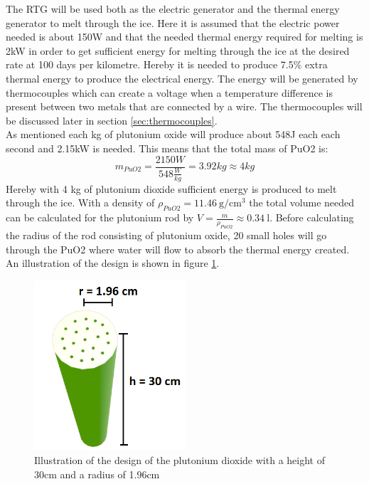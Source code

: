 \label{sec:ThermalDesign}
The RTG will be used both as the electric generator and the thermal energy generator to melt through the ice. Here it is assumed that the electric power needed is about 150W and that the needed thermal energy required for melting is 2kW in order to get sufficient energy for melting through the ice at the desired rate at 100 days per kilometre. Hereby it is needed to produce 7.5\% extra thermal energy to produce the electrical energy. The energy will be generated by thermocouples which can create a voltage when a temperature difference is present between two metals that are connected by a wire. The thermocouples will be discussed later in section \ref{sec:thermocouples}. \\

\noindent
As mentioned each kg of plutonium oxide will produce about 548J each each second and 2.15kW is needed. This means that the total mass of PuO2 is: 
\begin{equation}
m_{PuO2} = \frac{2150W}{548 \frac{W}{kg}} = 3.92 kg \approx 4 kg 
\end{equation}
Hereby with 4 kg of plutonium dioxide sufficient energy is produced to melt through the ice. With a density of $\rho_{PuO2} = \SI{11.46}{\gram\per\cubic\cm}$\cite{golovnin2001a} the total volume needed can be calculated for the plutonium rod by $V = \frac{m}{\rho_{PuO2}} \approx \SI{0.34}{\litre}$. Before calculating the radius of the rod consisting of plutonium oxide, 20 small holes will go through the PuO2 where water will flow to absorb the thermal energy created. An illustration of the design is shown in figure \ref{fig:RTGcenter}.
\begin{figure}[htb]
  \centering
  \includegraphics[width=0.5\textwidth]{figures/Ricardo/RTG3.png}
  \caption{Illustration of the design of the plutonium dioxide with a height of 30cm and a radius of 1.96cm}
  \label{fig:RTGcenter}
\end{figure}
